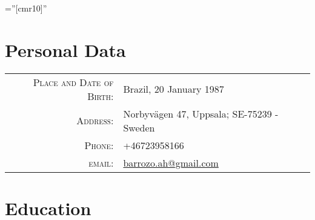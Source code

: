\documentclass[a4paper,10pt]{article} %
\begin{document}
\pagestyle{empty} %

\font\fb=''[cmr10]'' %


\par{\bigskip\par} %

\section{Personal Data}

\begin{tabular}{rl}
\textsc{Place and Date of Birth:} &  Brazil, 20 January 1987 \\
\textsc{Address:} & Norbyv\"agen 47, Uppsala; SE-75239 - Sweden \\
\textsc{Phone:} & +46723958166 \\
\textsc{email:} & \href{mailto:barrozo.ah@gmail.com}{barrozo.ah@gmail.com}
\end{tabular}


\section{Education}
\end{document}
